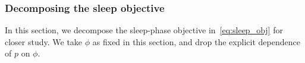 


\subsubsection{Decomposing the sleep objective}
\label{sec:sleep_details}
In this section, we decompose the sleep-phase objective in~\eqref{eq:sleep_obj} for closer study. 
We take $\phi$ as fixed in this section, and drop the explicit dependence of $p$ on $\phi$.

